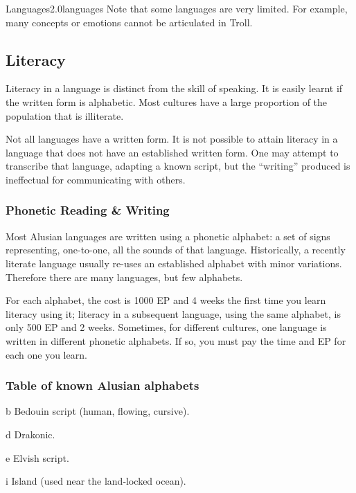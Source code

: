 \begin{skill}{Languages}{2.0}{languages}
Note that some languages are very limited. For example, many concepts
or emotions cannot be articulated in Troll.

\subsection{Literacy}

Literacy in a language is distinct from the skill of speaking. It is
easily learnt if the written form is alphabetic. Most cultures have a
large proportion of the population that is illiterate.

Not all languages have a written form. It is not possible to attain
literacy in a language that does not have an established written
form. One may attempt to transcribe that language, adapting a known
script, but the ``writing'' produced is ineffectual for communicating
with others.

\subsubsection{Phonetic Reading \& Writing}

Most Alusian languages are written using a phonetic alphabet: a set of
signs representing, one-to-one, all the sounds of that language.
Historically, a recently literate language usually re-uses an
established alphabet with minor variations. Therefore there are many
languages, but few alphabets.

For each alphabet, the cost is 1000 EP and 4 weeks the first time you
learn literacy using it; literacy in a subsequent language, using the
same alphabet, is only 500 EP and 2 weeks. Sometimes, for different
cultures, one language is written in different phonetic alphabets. If
so, you must pay the time and EP for each one you learn.

\subsubsection{Table of known Alusian alphabets}
\label{languages:scripts}
\begin{Description}
\item[b] Bedouin script (human, flowing, cursive).

\item[d] Drakonic.

\item[e] Elvish script.

\item[i] Island (used near the land-locked ocean).


\end{Description}
\end{skill}
